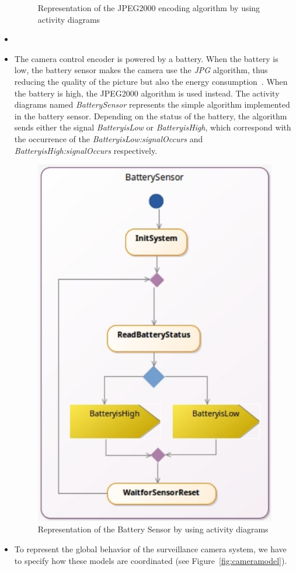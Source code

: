 \begin{itemize}
\begin{figure}[h]
\begin{minipage}{0.45\textwidth}
			\caption{Representation of the JPEG2000 encoding algorithm by using activity diagrams}
			\label{fig:dojpeg2000}
		\end{minipage}
	\end{figure}
	


	\item {}
	\item The camera control encoder is powered by a battery. When the battery is low, the battery sensor makes the camera use the \emph{JPG} algorithm, thus reducing the quality of the picture but also the energy consumption~\cite{encodingcomparison}. When the battery is high, the JPEG2000 algorithm is used instead. The activity diagrams named \emph{BatterySensor} represents the simple algorithm implemented in the battery sensor. Depending on the status of the battery, the algorithm sends either the signal \emph{BatteryisLow} or \emph{BatteryisHigh}, which correspond with the occurrence of the \mse \emph{BatteryisLow:signalOccurs} and \emph{BatteryisHigh:signalOccurs} respectively.
	
	
			\begin{figure}[h]
				\center
				\includegraphics[width=.3\columnwidth]{examples/figs/BatterySensor.pdf}
				\caption{Representation of the Battery Sensor by using activity diagrams}
				\label{fig:batterysensor}
			\end{figure}

	\item To represent the global behavior of the surveillance camera system, we have to specify how these models are coordinated (see Figure~\ref{fig:cameramodel}).
	
	
	

\end{itemize}

